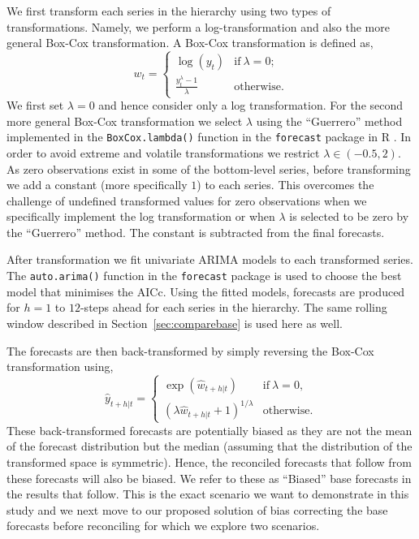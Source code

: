 \documentclass[12pt]{article}
\theoremstyle{definition}
\begin{document}
{We first transform each series in the hierarchy using two types of transformations. Namely, we perform a log-transformation and also the more general Box-Cox transformation. A Box-Cox transformation is defined as,
\begin{equation*}\label{eq:BoxCox_transformation}
w_t = \begin{cases}
        \log(y_t)                        & \text{if}~\lambda=0;\\
        \frac{y_t^\lambda - 1}{\lambda}  & \text{otherwise}.
      \end{cases}
\end{equation*}
We first set $\lambda=0$ and hence consider only a log transformation. For the second more general Box-Cox transformation we select $\lambda$ using the ``Guerrero'' method \citep{guerrero1993time} implemented in the \verb|BoxCox.lambda()| function in the \verb|forecast| package in R \citep{Rforecast}. In order to avoid extreme and volatile transformations we restrict $\lambda \in (-0.5,2)$. As zero observations exist in some of the bottom-level series, before transforming we add a constant (more specifically $1$) to each series. This overcomes the challenge of undefined transformed values for zero observations when we specifically implement the log transformation or when $\lambda$ is selected to be zero by the ``Guerrero'' method. The constant is subtracted from the final forecasts.

After transformation we fit univariate ARIMA models to each transformed series. The \verb|auto.arima()| function in the \verb|forecast| package is used to choose the best model that minimises the AICc. Using the fitted models, forecasts are produced for $h=1$ to $12$-steps ahead for each series in the hierarchy. The same rolling window described in Section~\ref{sec:comparebase} is used here as well.

The forecasts are then back-transformed by simply reversing the Box-Cox transformation using,
\begin{equation}\label{eq:BoxCox_back-transformation}
  \hat{y}_{t+h|t} =
    \begin{cases}
      \exp({\hat{w}_{t+h|t}})                   & \text{if}~\lambda = 0, \\
      (\lambda \hat{w}_{t+h|t} + 1)^{1/\lambda} & \text{otherwise.}
  \end{cases}
\end{equation}
These back-transformed forecasts are potentially biased as they are not the mean of the forecast distribution but the median (assuming that the distribution of the transformed space is symmetric). Hence, the reconciled forecasts that follow from these forecasts will also be biased. We refer to these as ``Biased'' base forecasts in the results that follow. This is the exact scenario we want to demonstrate in this study and we next move to our proposed solution of bias correcting the base forecasts before reconciling for which we explore two scenarios.

}
\end{document}
